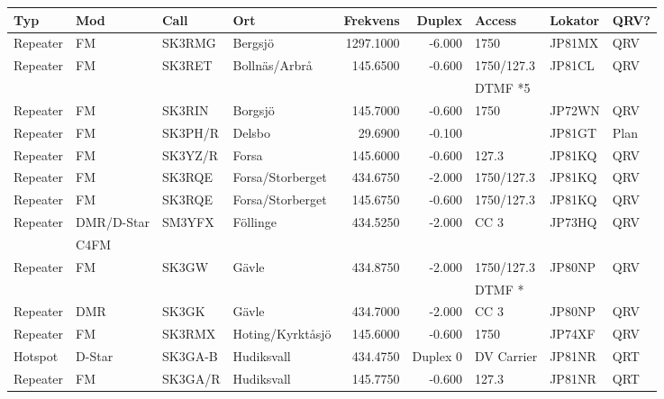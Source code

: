 \begin{longtable}{llllrrlll}
\bf Typ  & \bf Mod     & \bf Call & \bf Ort     & \bf Frekvens & \bf Duplex & \bf Access & \bf Lokator & \bf QRV? \\ \hline
Repeater   & FM         & SK3RMG   & Bergsjö          & 1297.1000   & -6.000   & 1750       & JP81MX & QRV  \\
Repeater   & FM         & SK3RET   & Bollnäs/Arbrå    & 145.6500    & -0.600   & 1750/127.3 & JP81CL & QRV  \\
           &            &          &                  &             &          & DTMF *5    &        &      \\
Repeater   & FM         & SK3RIN   & Borgsjö          & 145.7000    & -0.600   & 1750       & JP72WN & QRV  \\
Repeater   & FM         & SK3PH/R  & Delsbo           & 29.6900     & -0.100   &            & JP81GT & Plan \\
Repeater   & FM         & SK3YZ/R  & Forsa            & 145.6000    & -0.600   & 127.3      & JP81KQ & QRV  \\
Repeater   & FM         & SK3RQE   & Forsa/Storberget & 434.6750    & -2.000   & 1750/127.3 & JP81KQ & QRV  \\
Repeater   & FM         & SK3RQE   & Forsa/Storberget & 145.6750    & -0.600   & 1750/127.3 & JP81KQ & QRV  \\
Repeater   & DMR/D-Star & SM3YFX   & Föllinge         & 434.5250    & -2.000   & CC 3       & JP73HQ & QRV  \\
           & C4FM       &          &                  &             &          &            &        &      \\
Repeater   & FM         & SK3GW    & Gävle            & 434.8750    & -2.000   & 1750/127.3 & JP80NP & QRV  \\
           &            &          &                  &             &          & DTMF *     &        &      \\
Repeater   & DMR        & SK3GK    & Gävle            & 434.7000    & -2.000   & CC 3       & JP80NP & QRV  \\
Repeater   & FM         & SK3RMX   & Hoting/Kyrktåsjö & 145.6000    & -0.600   & 1750       & JP74XF & QRV  \\
Hotspot    & D-Star     & SK3GA-B  & Hudiksvall       & 434.4750    & Duplex 0 & DV Carrier & JP81NR & QRT  \\
Repeater   & FM         & SK3GA/R  & Hudiksvall       & 145.7750    & -0.600   & 127.3      & JP81NR & QRT  \\

\end{longtable}
